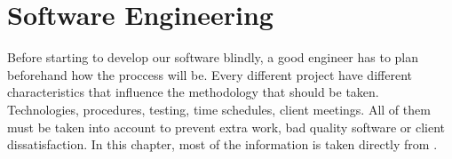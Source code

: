 \chapter{Software Engineering}

Before starting to develop our software blindly, a good engineer has to plan
beforehand how the proccess will be. Every different project have different
characteristics that influence the methodology that should be taken.
Technologies, procedures, testing, time schedules, client meetings. All of
them must be taken into account to prevent extra work, bad quality software or
client dissatisfaction. In this chapter, most of the information is taken
directly from \citet{Sommerville}.








